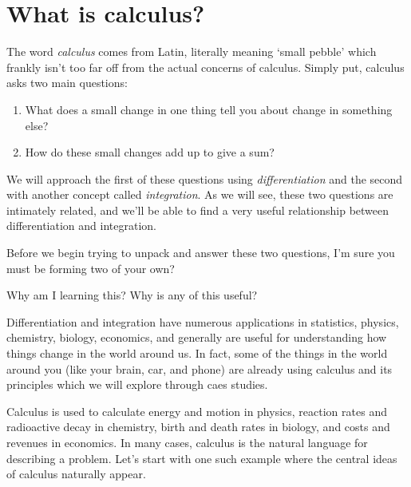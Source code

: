 
\section{What is calculus?} 

The word \emph{calculus} comes from Latin, literally meaning `small pebble' which frankly isn't too far off from the actual concerns of calculus. Simply put, calculus asks two main questions:

\begin{quest}\label{mainquestion}\leavevmode
	\begin{enumerate}
		\item What does a small change in one thing tell you about change in something else?
		\vspace{2mm}
		\item How do these small changes add up to give a sum?
	\end{enumerate}
\end{quest}

We will approach the first of these questions using \emph{differentiation} and the second with another concept called \emph{integration}. As we will see, these two questions are intimately related, and we'll be able to find a very useful relationship between differentiation and integration.

Before we begin trying to unpack and answer these two questions, I'm sure you must be forming two of your own?
\begin{quest}
Why am I learning this?	Why is any of this useful?
\end{quest}

Differentiation and integration have numerous applications in statistics, physics, chemistry, biology, economics, and generally are useful for understanding how things change in the world around us. In fact, some of the things in the world around you (like your brain, car, and phone) are already using calculus and its principles which we will explore through caes studies.

Calculus is used to calculate energy and motion in physics, reaction rates and radioactive decay in chemistry, birth and death rates in biology, and costs and revenues in economics. In many cases, calculus is the natural language for describing a problem. Let's start with one such example where the central ideas of calculus naturally appear.

